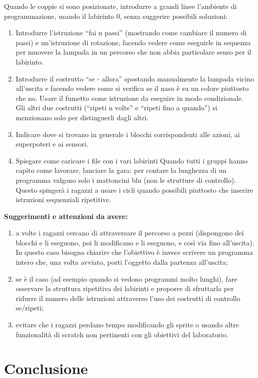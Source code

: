 \documentclass[12pt]{article}
\begin{document}
Quando le coppie si sono posizionate, introdurre a grandi linee l’ambiente di programmazione, usando il labirinto 0, senza suggerire possibili soluzioni:
\begin{enumerate}
\item Introdurre l’istruzione ``fai n passi'' (mostrando come cambiare il numero di passi) e un’istruzione di rotazione, facendo vedere come eseguirle in sequenza per muovere la lampada in un percorso che non abbia particolare senso per il labirinto.
\item Introdurre il costrutto ``se - allora'' spostando manualmente la lampada vicino all'uscita e facendo vedere come si verifica se il naso è su un colore piuttosto che no. Usare il fumetto come istruzione da eseguire in modo condizionale. Gli altri due costrutti (``ripeti n volte'' e ``ripeti fino a quando'') si menzionano solo per distinguerli dagli altri.
\item Indicare dove si trovano in generale i blocchi corrispondenti alle azioni, ai superpoteri e ai sensori.
\item Spiegare come caricare i file con i vari labirinti Quando tutti i gruppi hanno capito come lavorare, lanciare la gara: per contare la lunghezza di un programma valgono solo i mattoncini blu (non le strutture di controllo). Questo spingerà i ragazzi a usare i cicli quando possibili piuttosto che inserire istruzioni sequenziali ripetitive.
\end{enumerate}

\textbf{Suggerimenti e attenzioni da avere:}
\begin{enumerate}
\item a volte i ragazzi cercano di attraversare il percorso a pezzi (dispongono dei blocchi e li eseguono, poi li modificano e li eseguono, e così via fino all’uscita). In questo caso bisogna chiarire che l’obiettivo è invece scrivere un programma intero che, una volta avviato, porti l’oggetto dalla partenza all’uscita;
\item se è il caso (ad esempio quando si vedono programmi molto lunghi), fare osservare la struttura ripetitiva dei labirinti e proporre di sfruttarla per ridurre il numero delle istruzioni attraverso l’uso dei costrutti di controllo se/ripeti;
\item evitare che i ragazzi perdano tempo modificando gli sprite o usando altre funzionalità di scratch non pertinenti con gli obiettivi del laboratorio.
\end{enumerate}

\section{Conclusione}
\end{document}
